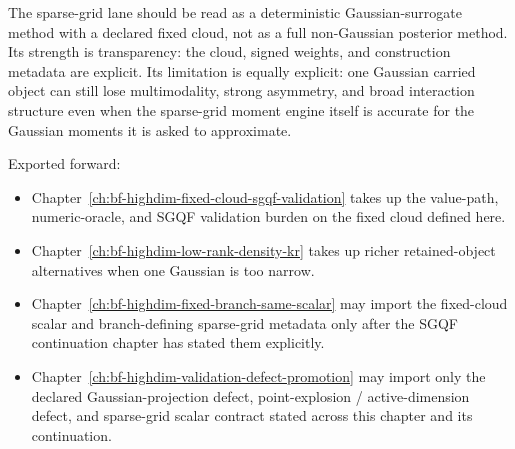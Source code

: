 The sparse-grid lane should be read as a deterministic Gaussian-surrogate method
with a declared fixed cloud, not as a full non-Gaussian posterior method.  Its
strength is transparency: the cloud, signed weights, and construction metadata
are explicit.  Its limitation is equally explicit: one Gaussian carried object
can still lose multimodality, strong asymmetry, and broad interaction structure
even when the sparse-grid moment engine itself is accurate for the Gaussian
moments it is asked to approximate.

Exported forward:
\begin{itemize}
  \item Chapter~\ref{ch:bf-highdim-fixed-cloud-sgqf-validation} takes up the
  value-path, numeric-oracle, and SGQF validation burden on the fixed cloud
  defined here.
  \item Chapter~\ref{ch:bf-highdim-low-rank-density-kr} takes up richer
  retained-object alternatives when one Gaussian is too narrow.
  \item Chapter~\ref{ch:bf-highdim-fixed-branch-same-scalar} may import the
  fixed-cloud scalar and branch-defining sparse-grid metadata only after the
  SGQF continuation chapter has stated them explicitly.
  \item Chapter~\ref{ch:bf-highdim-validation-defect-promotion} may import only
  the declared Gaussian-projection defect, point-explosion / active-dimension
  defect, and sparse-grid scalar contract stated across this chapter and its
  continuation.
\end{itemize}
